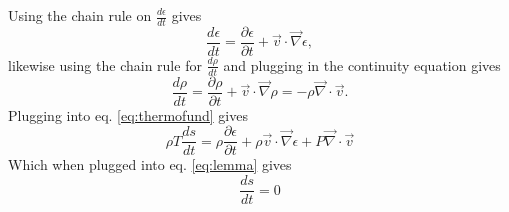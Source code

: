 \documentclass[11pt]{article}
\begin{document}
Using the chain rule on \(\frac{d \epsilon}{dt}\) gives
\begin{equation}
   \frac{d \epsilon}{dt} = \frac{\partial \epsilon}{\partial t} + \vec{v} \cdot \vec{\nabla} \epsilon,
\end{equation}
likewise using the chain rule for \(\frac{d \rho}{d t}\) and plugging in the continuity equation gives
\begin{equation}
   \frac{d \rho}{dt} = \frac{\partial \rho}{\partial t} + \vec{v} \cdot \vec{\nabla} \rho  = - \rho \vec{\nabla} \cdot \vec{v}.
\end{equation}
Plugging into eq. \ref{eq:thermofund} gives
\begin{equation}
    \rho T \frac{ds}{dt} = \rho \frac{\partial \epsilon}{\partial t} + \rho \vec{v} \cdot \vec{\nabla} \epsilon + P \vec{\nabla} \cdot \vec{v}
\end{equation}
Which when plugged into eq. \ref{eq:lemma} gives
\begin{equation}
   \frac{ds}{dt} = 0
\end{equation}
\end{document}

